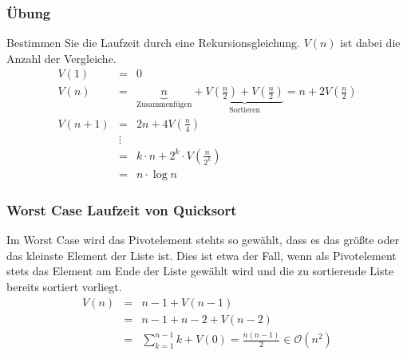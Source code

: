 \subsubsection{Übung}
Bestimmen Sie die Laufzeit durch eine Rekursionsgleichung.
\(V(n)\) ist dabei die Anzahl der Vergleiche.
\begin{eqnarray*}
	V(1) &=& 0 \\
	V(n) &=& \underbrace{n}_{\textrm{Zusammenfügen}} + \underbrace{V(\frac{n}{2}) + V(\frac{n}{2})}_{\textrm{Sortieren}} = n + 2V(\frac{n}{2}) \\
	V(n+1) &=& 2n + 4V(\frac{n}{4}) \\
		&\vdots&	\\
		&=& k \cdot n + 2^{k} \cdot V(\frac{n}{2^{k}})	\\
		&=&n \cdot \log n
\end{eqnarray*}

\subsubsection{Worst Case Laufzeit von Quicksort}
Im Worst Case wird das Pivotelement stehts so gewählt, dass es das größte oder das kleinste Element der Liste ist.
Dies ist etwa der Fall, wenn als Pivotelement stets das Element am Ende der Liste gewählt wird und die zu sortierende Liste bereits sortiert vorliegt.
\begin{eqnarray*}
	V(n) &=& n-1 + V(n-1)	\\
		 &=& n-1 + n-2 + V(n-2)	\\
		 &=& \sum \limits_{k=1}^{n-1} k + V(0) = \frac{n(n-1)}{2} \in \mathcal{O}(n^{2})
\end{eqnarray*}

